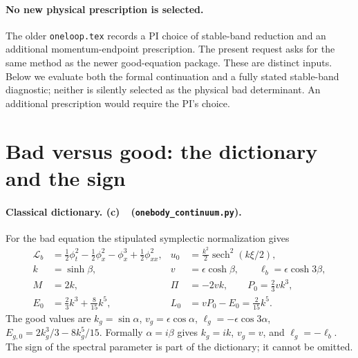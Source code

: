 \documentclass[11pt,a4paper]{article}
\newcommand{\Lc}{\textbf{(c)}\ }
\newcommand{\CC}{\texttt{onebody\_\allowbreak continuum.py}}
\begin{document}
\paragraph{No new physical prescription is selected.}
The older \texttt{oneloop.tex} records a PI choice of stable-band reduction
and an additional momentum-endpoint prescription. The present request asks
for the same method as the newer good-equation package. These are distinct
inputs. Below we evaluate both the formal continuation and a fully stated
stable-band diagnostic; neither is silently selected as the physical bad
determinant. An additional prescription would require the PI's choice.

\section{Bad versus good: the dictionary and the sign}
\paragraph{Classical dictionary. \Lc\ (\CC).}
For the bad equation the stipulated symplectic normalization gives
\begin{align}
 \mathcal L_b&=\tfrac12\phi_t^2-\tfrac12\phi_x^2-\phi_x^3
                         +\tfrac12\phi_{xx}^2, &
 u_0&=\tfrac{k^2}{2}\operatorname{sech}^2(k\xi/2),\\
 k&=\sinh\beta, &v&=\epsilon\cosh\beta,\qquad
 \ell_b=\epsilon\cosh3\beta,\\
 M&=2k, &\Pi&=-2vk,\qquad P_0=\tfrac23vk^3,\\
 E_0&=\tfrac23k^3+\tfrac8{15}k^5, &L_0&=vP_0-E_0=\tfrac2{15}k^5.
 \label{eq:badclass}
\end{align}
The good values are $k_g=\sin\alpha$, $v_g=\epsilon\cos\alpha$,
$\ell_g=-\epsilon\cos3\alpha$, $E_{g,0}=2k_g^3/3-8k_g^5/15$.
Formally $\alpha=i\beta$ gives $k_g=ik$, $v_g=v$, and
$\ell_g=-\ell_b$. The sign of the spectral parameter is part of the
dictionary; it cannot be omitted.
\end{document}

